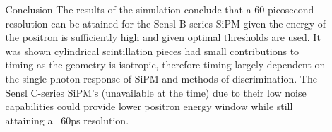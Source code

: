 \documentclass[final]{beamer}
\newlength{\sepwid}
\newlength{\onecolwid}
\newlength{\twocolwid}
\begin{document}
\begin{frame}[t]
\begin{columns}[t]
\begin{column}{\twocolwid}
\begin{columns}[t,totalwidth=\twocolwid] %

\begin{column}{\onecolwid} %





\end{column} %

\begin{column}{\onecolwid} %


 
\end{column} %

\end{columns} %




\end{column} %

\begin{column}{\sepwid}\end{column} %

\begin{column}{\onecolwid} %


\begin{block}{Conclusion}
The results of the simulation conclude that a 60 picosecond resolution can be attained for the Sensl B-series SiPM given the energy of the positron is sufficiently high and given optimal thresholds are used. It was shown cylindrical scintillation pieces had small contributions to timing as the geometry is isotropic, therefore timing largely dependent on the single photon response of SiPM and methods of discrimination. The Sensl C-series SiPM's (unavailable at the time) due to their low noise capabilities could provide lower positron energy window while still attaining a ~60ps resolution.



\end{block}
\end{column}
\end{columns}
\end{frame}
\end{document}
